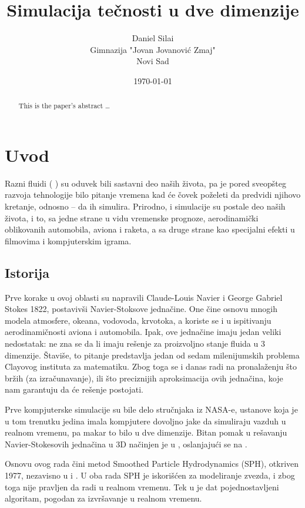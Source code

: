 \documentclass[12pt]{article}
\title{Simulacija te\v cnosti u dve dimenzije}
\author{
        Daniel Sila\dj i \\
        Gimnazija "Jovan Jovanovi\'{c} Zmaj"\\
		Novi Sad
}
\date{\today}
\begin{document}
\maketitle

\begin{abstract}
This is the paper's abstract \ldots
\end{abstract}

\section{Uvod}\label{uvod}
    Razni fluidi ( ) su oduvek bili sastavni deo na\v sih \v zivota, pa je pored sveop\v steg razvoja tehnologije bilo pitanje vremena kad \'ce \v covek po\v zeleti da predvidi njihovo kretanje, odnosno -- da ih simulira. Prirodno, i simulacije su postale deo na\v sih \v zivota, i to, sa jedne strane u vidu vremenske prognoze, aerodinami\v cki oblikovanih automobila, aviona i raketa, a sa druge strane kao specijalni efekti u filmovima i kompjuterskim igrama.

    \subsection{Istorija}\label{istorija}
        Prve korake u ovoj oblasti su napravili Claude-Louis Navier i George Gabriel Stokes 1822, postaviv\v si Navier-Stoksove jedna\v cine.
        One \v cine osnovu mnogih modela atmosfere, okeana, vodovoda, krvotoka, a koriste se i u ispitivanju aerodinami\v cnosti aviona i automobila. Ipak, ove jedna\v cine imaju jedan veliki nedostatak: ne zna se da li imaju re\v senje za proizvoljno stanje fluida u 3 dimenzije. \v Stavi\v se, to pitanje predstavlja jedan od sedam milenijumskih problema Clayovog instituta za matematiku. Zbog toga se i danas radi na pronala\v zenju \v sto br\v zih (za izra\v cunavanje), ili \v sto preciznijih aproksimacija ovih jedna\v cina, koje nam garantuju da \'ce re\v senje postojati.

        Prve kompjuterske simulacije su bile delo stru\v cnjaka iz NASA-e, ustanove koja je u tom trenutku jedina imala kompjutere dovoljno jake da simuliraju vazduh u realnom vremenu, pa makar to bilo u dve dimenzije. Bitan pomak u re\v savanju Navier-Stokesovih jedna\v cina u 3D na\v cinjen je u \cite{Foster:1996:RAL:244304.244315}, oslanjaju\'ci se na \cite{harlow:2182}.

        Osnovu ovog rada \v cini metod Smoothed Particle Hydrodynamics (SPH), otkriven 1977, nezavisno u \cite{1977MNRAS.181..375G} i \cite{1977AJ.....82.1013L}. U oba rada SPH je iskori\v s\'cen za modeliranje zvezda, i zbog toga nije pravljen da radi u realnom vremenu. Tek u \cite{Muller:2003:PFS:846276.846298} je dat pojednostavljeni algoritam, pogodan za izvr\v savanje u realnom vremenu.
\end{document}
